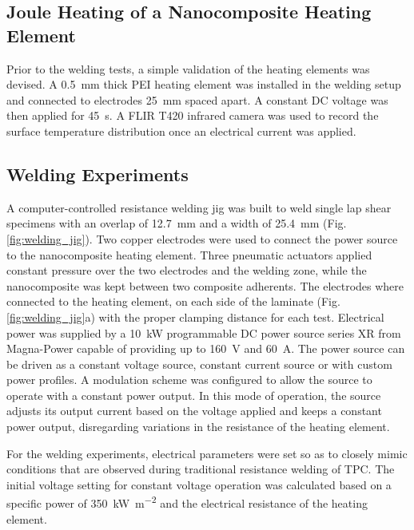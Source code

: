 \subsection{Joule Heating of a Nanocomposite Heating Element}

Prior to the welding tests, a simple validation of the heating elements was devised. 
A \SI{0.5}{\milli\metre} thick PEI heating element was installed in the welding setup and connected to electrodes \SI{25}{\mm} spaced apart. 
A constant DC voltage was then applied for \SI{45}{\s}. 
A FLIR T420 infrared camera was used to record the surface temperature distribution once an electrical current was applied. 

\subsection{Welding Experiments}

A computer-controlled resistance welding jig was built to weld single lap shear specimens with an overlap of \SI{12.7}{\milli\metre} and a width of \SI{25.4}{\milli\metre} (Fig. \ref{fig:welding_jig}). 
Two copper electrodes were used to connect the power source to the nanocomposite heating element. 
Three pneumatic actuators applied constant pressure over the two electrodes and the welding zone, while the nanocomposite was kept between two composite adherents. 
The electrodes where connected to the heating element, on each side of the laminate (Fig. \ref{fig:welding_jig}a) with the proper clamping distance for each test. 
Electrical power was supplied by a \SI{10}{\kW} programmable DC power source series XR from Magna-Power capable of providing up to \SI{160}{\volt} and \SI{60}{\ampere}. 
The power source can be driven as a constant voltage source, constant current source or with custom power profiles. 
A modulation scheme was configured to allow the source to operate with a constant power output. 
In this mode of operation, the source adjusts its output current based on the voltage applied and keeps a constant power output, disregarding variations in the resistance of the heating element. 

For the welding experiments, electrical parameters were set so as to closely mimic conditions that are observed during traditional resistance welding of TPC. 
The initial voltage setting for constant voltage operation was calculated based on a specific power of \SI{350}{\kW\per\square\metre} and the electrical resistance of the heating element. 

